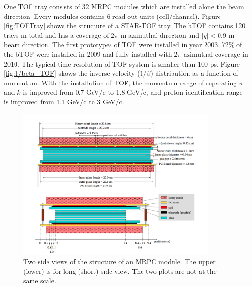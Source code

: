 One TOF tray consists of 32 MRPC modules which are installed alone
the beam direction. Every modules contains 6 read out units (cell/channel).
Figure \ref{fig:TOFTray} shows the structure of a STAR-TOF tray.
The bTOF contains 120 trays in total and has a coverage of $2\pi$
in azimuthal direction and $|\eta|<0.9$ in beam direction. The first
prototypes of TOF were installed in year 2003. 72\% of the bTOF were
installed in 2009 and fully installed with $2\pi$ azimuthal coverage
in 2010. The typical time resolution of TOF system is smaller than
100 ps. Figure \ref{fig:1/beta_TOF} shows the inverse velocity ($1/\beta$)
distribution as a function of momentum. With the installation of TOF,
the momentum range of separating $\pi$ and $k$ is improved from
0.7 GeV/c to 1.8 GeV/c, and proton identification range is improved
from 1.1 GeV/c to 3 GeV/c.

\begin{figure}
\begin{centering}
\includegraphics[width=0.9\textwidth]{fig/2.Detector/TOF/MRPC}
\par\end{centering}

\protect\caption{Two side views of the structure of an MRPC module. The upper (lower)
is for long (short) side view. The two plots are not at the same scale. }


\label{fig:MRPC}
\end{figure}
 

